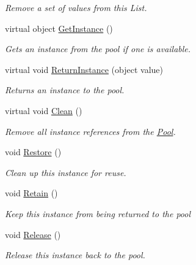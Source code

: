 \begin{DoxyCompactItemize}
\begin{DoxyCompactList}\small\item\em Remove a set of values from this List. \end{DoxyCompactList}\item 
virtual object \hyperlink{classstrange_1_1extensions_1_1pool_1_1impl_1_1_pool_ab09cbaa24c308da83a2a923e1aaf6010}{Get\-Instance} ()
\begin{DoxyCompactList}\small\item\em Gets an instance from the pool if one is available. \end{DoxyCompactList}\item 
virtual void \hyperlink{classstrange_1_1extensions_1_1pool_1_1impl_1_1_pool_a0b9746cdab600d749994dfa3de604fc2}{Return\-Instance} (object value)
\begin{DoxyCompactList}\small\item\em Returns an instance to the pool. \end{DoxyCompactList}\item 
virtual void \hyperlink{classstrange_1_1extensions_1_1pool_1_1impl_1_1_pool_af4a9b202649b74935b2d02721b4c29a7}{Clean} ()
\begin{DoxyCompactList}\small\item\em Remove all instance references from the \hyperlink{classstrange_1_1extensions_1_1pool_1_1impl_1_1_pool}{Pool}. \end{DoxyCompactList}\item 
void \hyperlink{classstrange_1_1extensions_1_1pool_1_1impl_1_1_pool_a5a936efde1ae47310598a1b54c68db44}{Restore} ()
\begin{DoxyCompactList}\small\item\em Clean up this instance for reuse. \end{DoxyCompactList}\item 
void \hyperlink{classstrange_1_1extensions_1_1pool_1_1impl_1_1_pool_a31dd0baa23e31b9fe079783acdbbef4b}{Retain} ()
\begin{DoxyCompactList}\small\item\em Keep this instance from being returned to the pool \end{DoxyCompactList}\item 
void \hyperlink{classstrange_1_1extensions_1_1pool_1_1impl_1_1_pool_added3d6c62335be5ee0dd2e88c1b9f66}{Release} ()
\begin{DoxyCompactList}\small\item\em Release this instance back to the pool. \end{DoxyCompactList}\end{DoxyCompactItemize}
